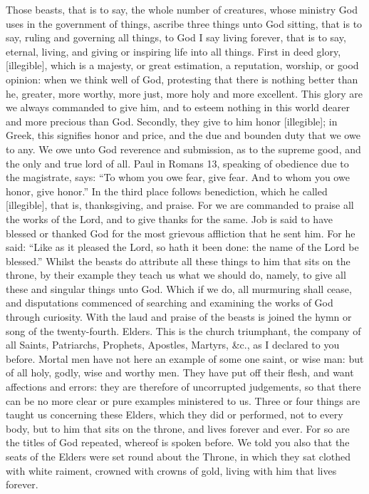 Those beasts, that is to say, the whole number of creatures, whose ministry God uses in the government of things, ascribe three things unto God sitting, that is to say, ruling and governing all things, to God I say living forever, that is to say, eternal, living, and giving or inspiring life into all things. First in deed glory, [illegible], which is a majesty, or great estimation, a reputation, worship, or good opinion: when we think well of God, protesting that there is nothing better than he, greater, more worthy, more just, more holy and more excellent. This glory are we always commanded to give him, and to esteem nothing in this world dearer and more precious than God. Secondly, they give to him honor [illegible]; in Greek, this signifies honor and price, and the due and bounden duty that we owe to any. We owe unto God reverence and submission, as to the supreme good, and the only and true lord of all. Paul in Romans 13, speaking of obedience due to the magistrate, says: “To whom you owe fear, give fear. And to whom you owe honor, give honor.” In the third place follows benediction, which he called [illegible], that is, thanksgiving, and praise. For we are commanded to praise all the works of the Lord, and to give thanks for the same. Job is said to have blessed or thanked God for the most grievous affliction that he sent him. For he said: “Like as it pleased the Lord, so hath it been done: the name of the Lord be blessed.” Whilst the beasts do attribute all these things to him that sits on the throne, by their example they teach us what we should do, namely, to give all these and singular things unto God. Which if we do, all murmuring shall cease, and disputations commenced of searching and examining the works of God through curiosity. With the laud and praise of the beasts is joined the hymn or song of the twenty-fourth. Elders. This is the church triumphant, the company of all Saints, Patriarchs, Prophets, Apostles, Martyrs, \&c., as I declared to you before. Mortal men have not here an example of some one saint, or wise man: but of all holy, godly, wise and worthy men. They have put off their flesh, and want affections and errors: they are therefore of uncorrupted judgements, so that there can be no more clear or pure examples ministered to us. Three or four things are taught us concerning these Elders, which they did or performed, not to every body, but to him that sits on the throne, and lives forever and ever. For so are the titles of God repeated, whereof is spoken before. We told you also that the seats of the Elders were set round about the Throne, in which they sat clothed with white raiment, crowned with crowns of gold, living with him that lives forever.

